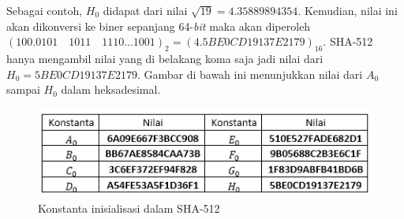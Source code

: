 Sebagai contoh, \begin{math}H_0\end{math} didapat dari nilai \begin{math}\sqrt{19} = 4.35889894354\end{math}. Kemudian, nilai ini akan dikonversi ke biner sepanjang 64-\textit{bit} maka akan diperoleh \begin{math}(100.0101\quad 1011\quad 1110 ... 1001)_2=(4.5BE0CD19137E2179)_{16}\end{math}. SHA-512 hanya mengambil nilai yang di belakang koma saja jadi nilai dari \begin{math}H_0 = 5BE0CD19137E2179\end{math}. Gambar di bawah ini menunjukkan nilai dari \begin{math}A_0\end{math} sampai \begin{math}H_0\end{math} dalam heksadesimal.

\begin{figure}[ht]
	\includegraphics[scale=0.8]{Gambar/konstanta_sha}
	\centering
	\caption{Konstanta inisialisasi dalam SHA-512}\label{fig:konstanta_sha}
\end{figure}

